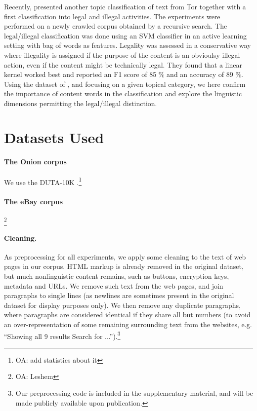 \documentclass[11pt,a4paper,table]{article}
\newcommand{\oa}[1]{\footnote{\color{red}OA: #1}}
\begin{document}
Recently, \citet{Avarikioti18} presented another topic classification of text from Tor together with a first classification into legal and illegal activities.  The experiments were performed on a newly crawled corpus obtained by a recursive search. The legal/illegal classification was done using an SVM classifier in an active learning setting with bag of words as features. Legality was assessed in a conservative way where illegality is assigned if the purpose of the content is an obvioulsy illegal action, even if the content might be technically legal. They found that a linear kernel worked best and reported an F1 score of 85 \% and an accuracy of 89 \%. Using the dataset of \citet{AlNabki19}, and focusing on a given topical category, we here confirm the importance of content words in the classification and explore the linguistic dimensions permitting the legal/illegal distinction. 




\section{Datasets Used}\label{sec:data} \label{datasets}

\paragraph{The Onion corpus} We use the DUTA-10K \citep{AlNabki19}.\oa{add statistics about it}

\paragraph{The eBay corpus}\oa{Leshem}

\paragraph{Cleaning.} 
As preprocessing for all experiments, we apply some cleaning to the text
of web pages in our corpus.
HTML markup is already removed in the original dataset,
but much nonlinguistic content remains, such as
buttons, encryption keys, metadata and URLs.
We remove such text from the web pages, and join paragraphs 
to single lines (as newlines are sometimes present in the original dataset for display purposes only).
We then remove any duplicate paragraphs, where paragraphs are considered
identical if they share all but numbers (to avoid an over-representation of some remaining surrounding text from the websites, e.g. ``Showing all 9 results Search for ...'').\footnote{Our preprocessing code is included in the supplementary material, and will be made publicly available upon publication.}
\end{document}
